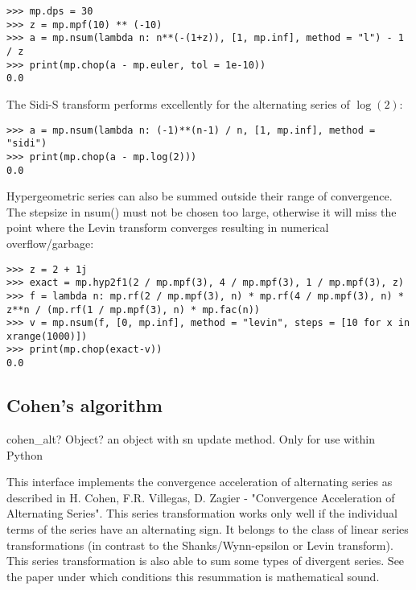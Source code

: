 \begin{lstlisting}
>>> mp.dps = 30
>>> z = mp.mpf(10) ** (-10)
>>> a = mp.nsum(lambda n: n**(-(1+z)), [1, mp.inf], method = "l") - 1 / z
>>> print(mp.chop(a - mp.euler, tol = 1e-10))
0.0
\end{lstlisting}

The Sidi-S transform performs excellently for the alternating series of $\log(2)$:

\begin{lstlisting}
>>> a = mp.nsum(lambda n: (-1)**(n-1) / n, [1, mp.inf], method = "sidi")
>>> print(mp.chop(a - mp.log(2)))
0.0
\end{lstlisting}

Hypergeometric series can also be summed outside their range of convergence. The stepsize in nsum() must not be chosen too large, otherwise it will miss the point where the Levin transform converges resulting in numerical overflow/garbage:

\begin{lstlisting}
>>> z = 2 + 1j
>>> exact = mp.hyp2f1(2 / mp.mpf(3), 4 / mp.mpf(3), 1 / mp.mpf(3), z)
>>> f = lambda n: mp.rf(2 / mp.mpf(3), n) * mp.rf(4 / mp.mpf(3), n) * z**n / (mp.rf(1 / mp.mpf(3), n) * mp.fac(n))
>>> v = mp.nsum(f, [0, mp.inf], method = "levin", steps = [10 for x in xrange(1000)])
>>> print(mp.chop(exact-v))
0.0
\end{lstlisting}



\subsection{Cohen's algorithm}

\begin{mpFunctionsExtract}
	\mpFunctionZero
	{cohen\_alt? Object? an object with sn update method. Only for use within Python}	
\end{mpFunctionsExtract}


\vpara
This interface implements the convergence acceleration of alternating series as described in H. Cohen, F.R. Villegas, D. Zagier - "Convergence Acceleration of Alternating Series". This series transformation works only well if the individual terms of the series have an alternating sign. It belongs to the class of linear series transformations (in contrast to the Shanks/Wynn-epsilon or Levin transform). This series transformation is also able to sum some types of divergent series. See the paper under which conditions this resummation is mathematical sound.

